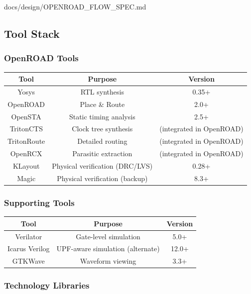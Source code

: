 \begin{relocated}{docs/design/OPENROAD_FLOW_SPEC.md}
\subsection{Tool Stack}\label{tm:pd:openroad-flow:tool-stack}

\subsubsection{OpenROAD Tools}\label{tm:pd:openroad-flow:openroad-tools}

{
\begin{longtable}[]{@{}ccc@{}}
\toprule\noalign{}
Tool & Purpose & Version \\
\midrule\noalign{}
\endhead
\bottomrule\noalign{}
\endlastfoot
Yosys & RTL synthesis & 0.35+ \\
OpenROAD & Place \& Route & 2.0+ \\
OpenSTA & Static timing analysis & 2.5+ \\
TritonCTS & Clock tree synthesis & (integrated in OpenROAD) \\
TritonRoute & Detailed routing & (integrated in OpenROAD) \\
OpenRCX & Parasitic extraction & (integrated in OpenROAD) \\
KLayout & Physical verification (DRC/LVS) & 0.28+ \\
Magic & Physical verification (backup) & 8.3+ \\
\end{longtable}
}

\subsubsection{Supporting Tools}\label{tm:pd:openroad-flow:supporting-tools}

{
\begin{longtable}[]{@{}ccc@{}}
\toprule\noalign{}
Tool & Purpose & Version \\
\midrule\noalign{}
\endhead
\bottomrule\noalign{}
\endlastfoot
Verilator & Gate-level simulation & 5.0+ \\
Icarus Verilog & UPF-aware simulation (alternate) & 12.0+ \\
GTKWave & Waveform viewing & 3.3+ \\
\end{longtable}
}

\subsubsection{Technology Libraries}\label{tm:pd:openroad-flow:technology-libraries}


\end{relocated}
